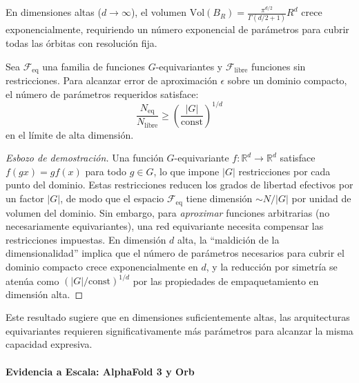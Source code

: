 En dimensiones altas ($d \to \infty$), el volumen $\text{Vol}(B_R) = \frac{\pi^{d/2}}{\Gamma(d/2 + 1)} R^d$ crece exponencialmente, requiriendo un número exponencial de parámetros para cubrir todas las órbitas con resolución fija.

\begin{proposition}
Sea $\mathcal{F}_{\text{eq}}$ una familia de funciones $G$-equivariantes y $\mathcal{F}_{\text{libre}}$ funciones sin restricciones. Para alcanzar error de aproximación $\epsilon$ sobre un dominio compacto, el número de parámetros requeridos satisface:
\begin{equation}
\frac{N_{\text{eq}}}{N_{\text{libre}}} \geq \left(\frac{|G|}{\text{const}}\right)^{1/d}
\end{equation}
en el límite de alta dimensión.
\end{proposition}

\begin{proof}[Esbozo de demostración]
Una función $G$-equivariante $f: \mathbb{R}^d \to \mathbb{R}^d$ satisface $f(gx) = gf(x)$ para todo $g \in G$, lo que impone $|G|$ restricciones por cada punto del dominio. Estas restricciones reducen los grados de libertad efectivos por un factor $|G|$, de modo que el espacio $\mathcal{F}_{\text{eq}}$ tiene dimensión $\sim N/|G|$ por unidad de volumen del dominio. Sin embargo, para \textit{aproximar} funciones arbitrarias (no necesariamente equivariantes), una red equivariante necesita compensar las restricciones impuestas. En dimensión $d$ alta, la ``maldición de la dimensionalidad'' implica que el número de parámetros necesarios para cubrir el dominio compacto crece exponencialmente en $d$, y la reducción por simetría se atenúa como $(|G|/\text{const})^{1/d}$ por las propiedades de empaquetamiento en dimensión alta.
\end{proof}

Este resultado sugiere que en dimensiones suficientemente altas, las arquitecturas equivariantes requieren significativamente más parámetros para alcanzar la misma capacidad expresiva.

\paragraph{Evidencia a Escala: AlphaFold 3 y Orb}


